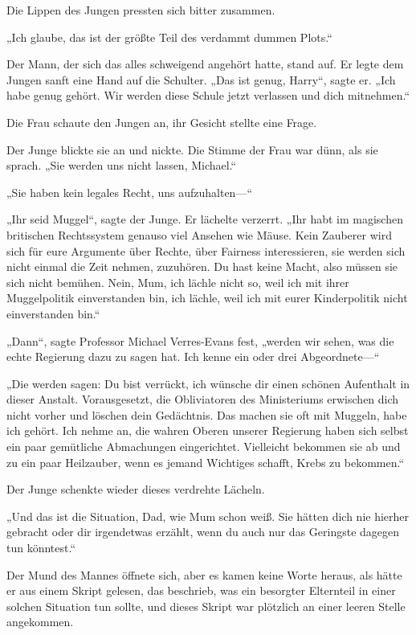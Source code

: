 {Die Lippen des Jungen pressten sich bitter zusammen.

„Ich glaube, das ist der größte Teil des verdammt dummen Plots.“

Der Mann, der sich das alles schweigend angehört hatte, stand auf. Er legte dem Jungen sanft eine Hand auf die Schulter. „Das ist genug, Harry“, sagte er. „Ich habe genug gehört. Wir werden diese Schule jetzt verlassen und dich mitnehmen.“

Die Frau schaute den Jungen an, ihr Gesicht stellte eine Frage.

Der Junge blickte sie an und nickte. Die Stimme der Frau war dünn, als sie sprach. „Sie werden uns nicht lassen, Michael.“

„Sie haben kein legales Recht, uns aufzuhalten—“

„Ihr seid Muggel“, sagte der Junge. Er lächelte verzerrt. „Ihr habt im magischen britischen Rechtssystem genauso viel Ansehen wie Mäuse. Kein Zauberer wird sich für eure Argumente über Rechte, über Fairness interessieren, sie werden sich nicht einmal die Zeit nehmen, zuzuhören. Du hast keine Macht, also müssen sie sich nicht bemühen. Nein, Mum, ich lächle nicht so, weil ich mit ihrer Muggelpolitik einverstanden bin, ich lächle, weil ich mit eurer Kinderpolitik nicht einverstanden bin.“

„Dann“, sagte Professor Michael Verres-Evans fest, „werden wir sehen, was die echte Regierung dazu zu sagen hat. Ich kenne ein oder drei Abgeordnete—“

„Die werden sagen: Du bist verrückt, ich wünsche dir einen schönen Aufenthalt in dieser Anstalt. Vorausgesetzt, die Obliviatoren des Ministeriums erwischen dich nicht vorher und löschen dein Gedächtnis. Das machen sie oft mit Muggeln, habe ich gehört. Ich nehme an, die wahren Oberen unserer Regierung haben sich selbst ein paar gemütliche Abmachungen eingerichtet. Vielleicht bekommen sie ab und zu ein paar Heilzauber, wenn es jemand Wichtiges schafft, Krebs zu bekommen.“

Der Junge schenkte wieder dieses verdrehte Lächeln.

„Und das ist die Situation, Dad, wie Mum schon weiß. Sie hätten dich nie hierher gebracht oder dir irgendetwas erzählt, wenn du auch nur das Geringste dagegen tun könntest.“

Der Mund des Mannes öffnete sich, aber es kamen keine Worte heraus, als hätte er aus einem Skript gelesen, das beschrieb, was ein besorgter Elternteil in einer solchen Situation tun sollte, und dieses Skript war plötzlich an einer leeren Stelle angekommen.

}
